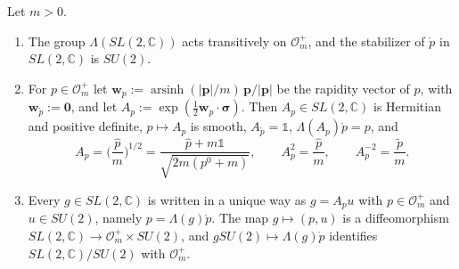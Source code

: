 \begin{proposition}\label{prop:orbit}
	Let $m>0$.
	\begin{enumerate}
		\item The group $\Lambda(SL(2,\mathbb{C}))$ acts transitively on $\mathcal{O}_m^+$, and the stabilizer of $\mathring{p}$ in $SL(2,\mathbb{C})$ is $SU(2)$.
		\item For $p\in\mathcal{O}_m^+$ let $\mathbf{w}_p:=\operatorname{arsinh}(|\mathbf{p}|/m)\,\mathbf{p}/|\mathbf{p}|$ be the rapidity vector of $p$, with $\mathbf{w}_{\mathring{p}}:=\mathbf{0}$, and let $A_p:=\exp(\tfrac12\mathbf{w}_p\cdot\boldsymbol{\sigma})$. Then $A_p\in SL(2,\mathbb{C})$ is Hermitian and positive definite, $p\mapsto A_p$ is smooth, $A_{\mathring{p}}=\mathbb{1}$, $\Lambda(A_p)\mathring{p}=p$, and
		\begin{equation}\label{eq:standard-boost}
			A_p=\Big(\frac{\hat{p}}{m}\Big)^{1/2}=\frac{\hat{p}+m\mathbb{1}}{\sqrt{2m(p^0+m)}},\qquad A_p^2=\frac{\hat{p}}{m},\qquad A_p^{-2}=\frac{\tilde{p}}{m}.
		\end{equation}
		\item Every $g\in SL(2,\mathbb{C})$ is written in a unique way as $g=A_pu$ with $p\in\mathcal{O}_m^+$ and $u\in SU(2)$, namely $p=\Lambda(g)\mathring{p}$. The map $g\mapsto(p,u)$ is a diffeomorphism $SL(2,\mathbb{C})\to\mathcal{O}_m^+\times SU(2)$, and $gSU(2)\mapsto\Lambda(g)\mathring{p}$ identifies $SL(2,\mathbb{C})/SU(2)$ with $\mathcal{O}_m^+$.
	\end{enumerate}
\end{proposition}

